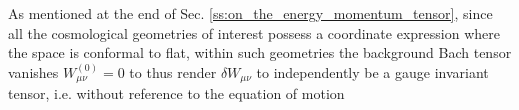 As mentioned at the end of Sec. \ref{ss:on_the_energy_momentum_tensor}, since all the cosmological geometries of interest possess a coordinate expression where the space is conformal to flat, within such geometries the background Bach tensor vanishes $W^{(0)}_{\mu\nu} = 0$ to thus render $\delta W_{\mu\nu}$ to independently be a gauge invariant tensor, i.e. without reference to the equation of motion 
%
